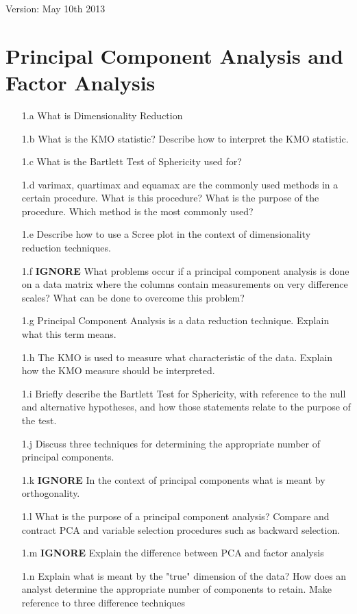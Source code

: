 \documentclass[a4paper,12pt]{article}
\begin{document}
Version: May 10th 2013
\section*{Principal Component Analysis and Factor Analysis}
\begin{itemize}
\item[1.a] What is Dimensionality Reduction
\item[1.b] What is the KMO statistic? Describe how to interpret the KMO statistic.
\item[1.c] What is the Bartlett Test of Sphericity used for?
\item[1.d] varimax, quartimax and equamax are the commonly used methods in a certain procedure. What is this procedure? What is the purpose of the procedure.
Which method is the most commonly used?
\item[1.e] Describe how to use a Scree plot in the context of dimensionality reduction techniques.
\item[1.f] \textbf{IGNORE} What problems occur if a principal component analysis is done on a data matrix where the columns contain measurements on very difference scales?  What can be done to overcome this problem?
\item[1.g] Principal Component Analysis is a data reduction technique. Explain what this term
means.
\item[1.h] The KMO is used to measure what characteristic of the data. Explain how the KMO
measure should be interpreted.
\item[1.i] Briefly describe the Bartlett Test for Sphericity, with reference to the null and alternative
hypotheses, and how those statements relate to the purpose of the test.
\item[1.j] Discuss three techniques for determining the appropriate number of principal components.
\item[1.k] \textbf{IGNORE} In the context of principal components what is meant by orthogonality.

\item[1.l] What is the purpose of a principal component analysis? Compare and contract PCA and variable selection procedures such as backward selection. 
\item[1.m] \textbf{IGNORE} Explain the difference between PCA and factor analysis
\item[1.n] Explain what is meant by the "true" dimension of the data? How does an analyst determine the appropriate number of components to retain. Make reference to three difference techniques
\end{itemize}
\end{document}
